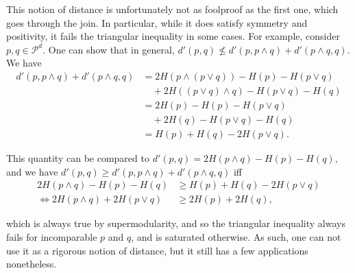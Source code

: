 This notion of distance is unfortunately not as foolproof as the first one, which goes through the join. In particular, while it does satisfy symmetry and positivity, it fails the triangular inequality in some cases. For example, consider $p, q \in \mathcal{P}^d$. One can show that in general, $d'(p, q) \nleq d'(p, p \wedge q) + d'(p \wedge q, q)$. We have
\begin{align}
    d'(p, p \wedge q) + d'(p \wedge q, q) &= 2 H(p \wedge (p \vee q)) - H(p) - H(p \vee q)\nonumber \\
                                          &\quad + 2 H((p \vee q) \wedge q) - H(p \vee q) - H(q)\\
                                          &= 2 H(p) - H(p) - H(p \vee q)\nonumber\\
                                          &\quad + 2 H(q) - H(p \vee q) - H(q)\\
                                          &= H(p) + H(q) - 2 H(p \vee q).
\end{align}

This quantity can be compared to $d'(p, q) = 2 H(p \wedge q) - H(p) - H(q)$, and we have $d'(p, q) \geq d'(p, p \wedge q) + d'(p \wedge q, q)$ iff
\begin{align}
    2 H(p \wedge q) - H(p) - H(q) &\geq H(p) + H(q) - 2 H(p \vee q)\\
    \iff 2 H(p \wedge q) + 2 H(p \vee q) &\geq 2 H(p) + 2 H(q),
\end{align}

which is always true by supermodularity, and so the triangular inequality always fails for incomparable $p$ and $q$, and is saturated otherwise. As such, one can not use it as a rigorous notion of distance, but it still has a few applications nonetheless.

